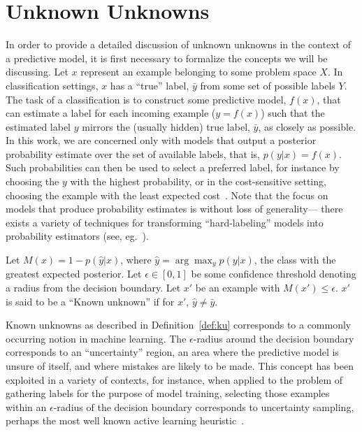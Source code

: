 \section{Unknown Unknowns}
\label{sec:unknowns}
In order to provide a detailed discussion of unknown unknowns in the context of a predictive model, it is first necessary to formalize the concepts we will be discussing. Let $x$ represent an example belonging to some problem space $X$. In classification settings, $x$ has a ``true'' label, $\bar{y}$ from some set of possible labels $Y$. The task of a classification is to construct some predictive model, $f(x)$, that can estimate a label for each incoming example ($y = f(x)$) such that the estimated label $y$ mirrors the (usually hidden) true label, $\bar{y}$, as closely as possible. In this work, we are concerned only with models that output a posterior probability estimate over the set of available labels, that is, $p(y | x) = f(x)$. Such probabilities can then be used to select a preferred label, for instance by choosing the $y$ with the highest probability, or in the cost-sensitive setting, choosing the example with the least expected cost~\cite{elkan:2001cost}. Note that the focus on models that produce probability estimates is without loss of generality--- there exists a variety of techniques for transforming ``hard-labeling'' models into probability estimators (see, eg.~\cite{domingos1999metacost, Platt99probabilisticoutputs}).

\begin{definition}
\label{def:ku}
Let $M(x) = 1-p(\hat{y} | x)$, where $\hat{y} = \arg \max_y p(y | x)$, the class with the greatest expected posterior. Let $\epsilon \in [0,1]$ be some confidence threshold denoting a  radius from the decision boundary. Let $x'$ be an example with $M(x') \leq \epsilon$. $x'$ is said to be a ``Known unknown'' if for $x'$, $\hat{y} \neq \bar{y}$.
\end{definition}

Known unknowns as described in Definition~\ref{def:ku} corresponds to a commonly occurring notion in machine learning. The $\epsilon$-radius around the decision boundary corresponds to an ``uncertainty'' region, an area where the predictive model is unsure of itself, and where mistakes are likely to be made. This concept has been exploited in a variety of contexts, for instance, when applied to the problem of gathering labels for the purpose of model training, selecting those examples within an $\epsilon$-radius of the decision boundary corresponds to uncertainty sampling, perhaps the most well known active learning heuristic~\cite{lewis94sequential}.

